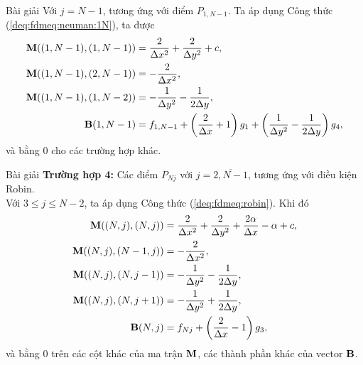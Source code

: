 \documentclass[9pt]{beamer}
\numberwithin{equation}{section}
\begin{document}
\begin{frame}
\begin{exampleblock}{Bài giải}
    Với $j = N-1$, tương ứng với điểm $P_{1,N-1}$. Ta áp dụng Công thức (\ref{deq:fdmeq:neuman:1N}), ta được
    \begin{align*}
        {\bf M}((1,N-1),(1,N-1)) &= \frac{2}{\Delta x^2} + \frac{2}{\Delta y^2} + c, \\
        {\bf M}((1,N-1),(2,N-1)) &= -\frac{2}{\Delta x^2}, \\
        {\bf M}((1,N-1),(1,N-2)) &= -\frac{1}{\Delta y^2} - \frac{1}{2 \Delta y}, \\
        {\bf B}(1,N-1) &= f_{1,N-1} + \left(\frac{2}{\Delta x} + 1\right) g_1 + \left(\frac{1}{\Delta y^2} - \frac{1}{2\Delta y}\right) g_4,
    \end{align*}
    và bằng 0 cho các trường hợp khác.
\end{exampleblock}
\end{frame}

\begin{frame}
\begin{exampleblock}{Bài giải}
    \textbf{Trường hợp 4:} Các điểm $P_{Nj}$ với $j=\overline{2,N-1}$, tương ứng với điều kiện Robin. \\

    Với $3 \le j \le N-2$, ta áp dụng Công thức (\ref{deq:fdmeq:robin}). Khi đó
    \begin{align*}
        {\bf M}((N,j),(N,j)) &= \frac{2}{\Delta x^2} + \frac{2}{\Delta y^2} + \frac{2\alpha}{\Delta x} - \alpha + c, \\
        {\bf M}((N,j),(N-1,j)) &= -\frac{2}{\Delta x^2}, \\
        {\bf M}((N,j),(N,j-1)) &= -\frac{1}{\Delta y^2} - \frac{1}{2\Delta y}, \\
        {\bf M}((N,j),(N,j+1)) &= -\frac{1}{\Delta y^2} + \frac{1}{2\Delta y}, \\
        {\bf B}(N,j) &= f_{Nj} + \left(\frac{2}{\Delta x} - 1\right) g_3,
    \end{align*}
    và bằng 0 trên các cột khác của ma trận ${\bf M}$, các thành phần khác của vector ${\bf B}$.
\end{exampleblock}
\end{frame}
\end{document}
